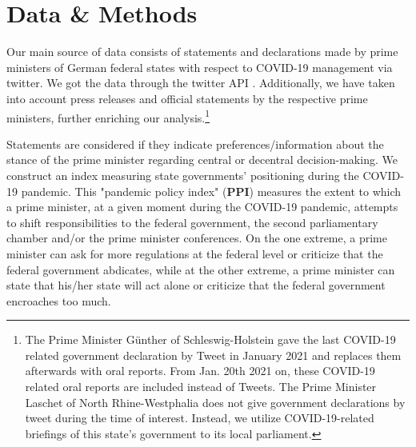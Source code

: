 \documentclass[12pt, abstracton]{scrartcl}
\begin{document}
\section{Data \& Methods}\label{sec.datamethods}
Our main source of data consists of statements and declarations made by prime ministers of German federal states with respect to COVID-19 management via twitter. We got the data through the twitter API \citep{Kearney2019}. Additionally, we have taken into account press releases and official statements by the respective prime ministers, further enriching our analysis.\footnote{
	The Prime Minister Günther of Schleswig-Holstein gave the last COVID-19 related government declaration by Tweet in January 2021 and replaces them afterwards with oral reports. From Jan. 20th 2021 on, these COVID-19 related oral reports are included instead of Tweets. The Prime Minister Laschet of North Rhine-Westphalia does not give government declarations by tweet during the time of interest. Instead, we utilize COVID-19-related briefings of this state’s government to its local parliament.
}

Statements are considered if they indicate preferences/information about the stance of the prime minister regarding central or decentral decision-making. We construct an index measuring state governments’ positioning during the COVID-19 pandemic. This "pandemic policy index" (\textbf{PPI}) measures the extent to which a prime minister, at a given moment during the COVID-19 pandemic, attempts to shift responsibilities to the federal government, the second parliamentary chamber and/or the prime minister conferences. On the one extreme, a prime minister can ask for more regulations at the federal level or criticize that the federal government abdicates, while at the other extreme, a prime minister can state that his/her state will act alone or criticize that the federal government encroaches too much.
\end{document}
